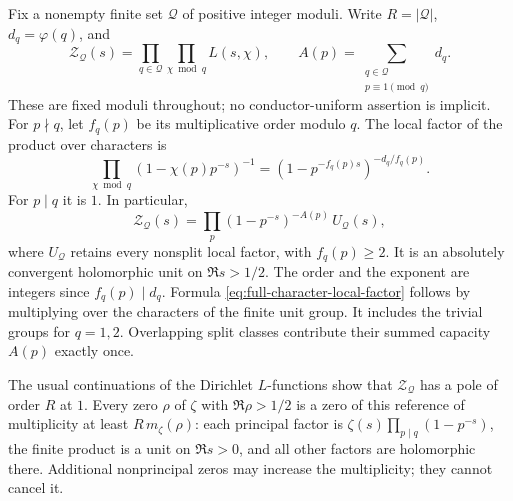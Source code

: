 \documentclass[11pt]{article}
\theoremstyle{definition}
\begin{document}
Fix a nonempty finite set $\mathcal Q$ of positive integer moduli.
Write $R=|\mathcal Q|$, $d_q=\varphi(q)$, and
\begin{equation}
 \mathcal Z_{\mathcal Q}(s)
   =\prod_{q\in\mathcal Q}\prod_{\chi\bmod q}L(s,\chi),
 \qquad
 A(p)=\sum_{\substack{q\in\mathcal Q\\p\equiv1\pmod q}}d_q.
 \label{eq:reverse-reference-capacity}
\end{equation}
These are fixed moduli throughout; no conductor-uniform assertion
is implicit. For $p\nmid q$, let $f_q(p)$ be its multiplicative
order modulo $q$. The local factor of the product over characters is
\begin{equation}
 \prod_{\chi\bmod q}(1-\chi(p)p^{-s})^{-1}
   =(1-p^{-f_q(p)s})^{-d_q/f_q(p)}.
 \label{eq:full-character-local-factor}
\end{equation}
For $p\mid q$ it is $1$. In particular,
\begin{equation}
 \mathcal Z_{\mathcal Q}(s)=
       \prod_p(1-p^{-s})^{-A(p)}\,U_{\mathcal Q}(s),
 \label{eq:split-nonsplit-factorization}
\end{equation}
where $U_{\mathcal Q}$ retains every nonsplit local factor, with
$f_q(p)\ge2$. It is an absolutely convergent holomorphic unit on
$\Re s>1/2$. The order and the exponent are integers since
$f_q(p)\mid d_q$. Formula \eqref{eq:full-character-local-factor}
follows by multiplying over the characters of the finite unit group.
It includes the trivial groups for $q=1,2$. Overlapping split classes
contribute their summed capacity $A(p)$ exactly once.

The usual continuations of the Dirichlet $L$-functions show that
$\mathcal Z_{\mathcal Q}$ has a pole of order $R$ at $1$.
Every zero $\rho$ of $\zeta$ with $\Re\rho>1/2$ is a zero of this
reference of multiplicity at least $R\,m_\zeta(\rho)$:
each principal factor is $\zeta(s)\prod_{p\mid q}(1-p^{-s})$,
the finite product is a unit on $\Re s>0$, and all other factors
are holomorphic there. Additional nonprincipal zeros may increase
the multiplicity; they cannot cancel it.
\end{document}
